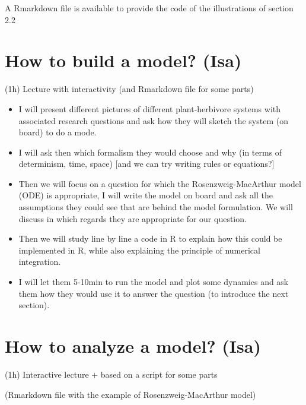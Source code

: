 \documentclass[
]{book}
\providecommand{\tightlist}{%
  \setlength{\itemsep}{0pt}\setlength{\parskip}{0pt}}
\theoremstyle{definition}
\theoremstyle{definition}
\theoremstyle{definition}
\theoremstyle{definition}
\theoremstyle{remark}
\begin{document}
A Rmarkdown file is available to provide the code of the illustrations of section 2.2

\chapter{How to build a model? (Isa)}\label{how-to-build-a-model-isa}

(1h) Lecture with interactivity (and Rmarkdown file for some parts)

\begin{itemize}
\tightlist
\item
  I will present different pictures of different plant-herbivore systems with associated research questions and ask how they will sketch the system (on board) to do a mode.
\item
  I will ask then which formalism they would choose and why (in terms of determinism, time, space) {[}and we can try writing rules or equations?{]}
\item
  Then we will focus on a question for which the Rosenzweig-MacArthur model (ODE) is appropriate, I will write the model on board and ask all the assumptions they could see that are behind the model formulation. We will discuss in which regards they are appropriate for our question.
\item
  Then we will study line by line a code in R to explain how this could be implemented in R, while also explaining the principle of numerical integration.
\item
  I will let them 5-10min to run the model and plot some dynamics and ask them how they would use it to answer the question (to introduce the next section).
\end{itemize}

\chapter{How to analyze a model? (Isa)}\label{how-to-analyze-a-model-isa}

(1h) Interactive lecture + based on a script for some parts

(Rmarkdown file with the example of Rosenzweig-MacArthur model)
\end{document}
